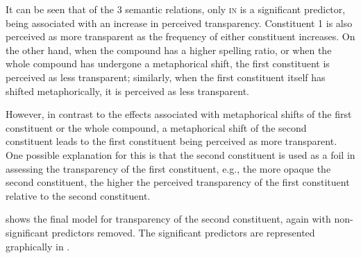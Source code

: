 It can be seen that of the 3 semantic relations, only \textsc{in} is a
significant predictor, being
associated with an increase in perceived transparency. Constituent 1
is also perceived as more transparent as the frequency of either
constituent increases. On the other hand, when the compound has a
higher spelling ratio, or when the whole compound has undergone
a metaphorical shift, the first constituent is perceived as less transparent;
similarly, when the first constituent itself has shifted
metaphorically, it is perceived as less transparent. 

However, in contrast
to the effects associated with metaphorical shifts of the first
constituent or the whole compound, a metaphorical shift of the second constituent
leads to the first constituent being perceived as more
transparent.\enlargethispage{1\baselineskip}
One possible explanation for this is that the
second constituent is used as a foil in assessing the transparency of
the first constituent, e.g., the more opaque the second constituent,
the higher the perceived transparency of the first constituent relative to the second constituent. 

 shows the final model for transparency
of the second constituent, again with non-significant predictors
removed. The significant predictors are
represented graphically in
. 

% 


